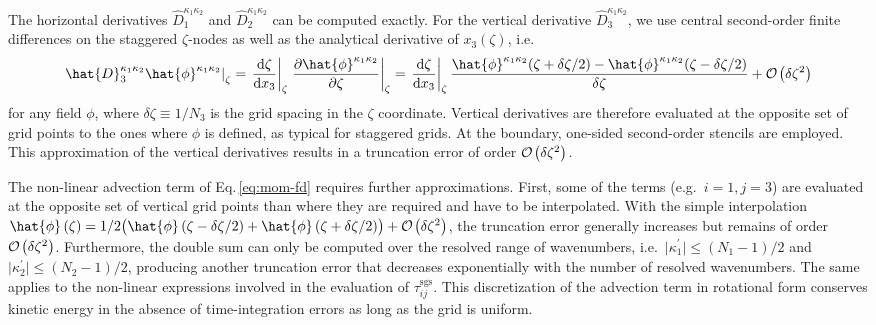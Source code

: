 \documentclass[gmd, manuscript]{copernicus}
\begin{document}
The horizontal derivatives \(\hat{D}_1^{\kappa_1\kappa_2}\) and \(\hat{D}_2^{\kappa_1\kappa_2}\) can be computed exactly.
For the vertical derivative \(\hat{D}_3^{\kappa_1\kappa_2}\), we use central second-order finite differences on the staggered \(\zeta\)-nodes \citep{MoinVerzicco2016} as well as the analytical derivative of \(x_3(\zeta)\), i.e.
\begin{equation}
  \left. \hat{D}_3^{\kappa_1\kappa_2} \hat{\phi}^{\kappa_1\kappa_2} \right|_{\zeta}
  = \left. \frac{\mathrm{d}\zeta}{\mathrm{d}x_3} \right|_\zeta \left. \frac{\partial \hat{\phi}^{\kappa_1\kappa_2}}{\partial \zeta} \right|_\zeta
  = \left. \frac{\mathrm{d}\zeta}{\mathrm{d}x_3} \right|_\zeta \frac{\hat{\phi}^{\kappa_1\kappa_2}(\zeta + \delta \zeta / 2) - \hat{\phi}^{\kappa_1\kappa_2}(\zeta - \delta \zeta / 2)}{\delta \zeta} + \mathcal{O} \mkern -1mu \left( \delta \zeta^2 \right)
\end{equation}
for any field \(\phi\), where \(\delta\zeta \equiv 1/N_3\) is the grid spacing in the \(\zeta\) coordinate.
Vertical derivatives are therefore evaluated at the opposite set of grid points to the ones where \(\phi\) is defined, as typical for staggered grids.
At the boundary, one-sided second-order stencils are employed.
This approximation of the vertical derivatives results in a truncation error of order \(\mathcal{O} \mkern -1mu \left( \delta \zeta^2 \right)\).

The non-linear advection term of Eq.\,\eqref{eq:mom-fd} requires further approximations.
First, some of the terms (e.g.~\(i=1, j=3\)) are evaluated at the opposite set of vertical grid points than where they are required and have to be interpolated.
With the simple interpolation \(\hat{\phi}\left(\zeta\right) = 1/2 \bigl( \hat{\phi}\left(\zeta-\delta\zeta/2\right) + \hat{\phi}\left(\zeta+\delta\zeta/2\right) \bigr) + \mathcal{O} \mkern -1mu \left( \delta \zeta^2 \right)\), the truncation error generally increases but remains of order \(\mathcal{O} \mkern -1mu \left( \delta\zeta^2 \right)\).
Furthermore, the double sum can only be computed over the resolved range of wavenumbers, i.e.~\(\lvert \kappa_1^\prime \rvert \le (N_1-1)/2\) and \(\lvert \kappa_2^\prime \rvert \le (N_2-1)/2\), producing another truncation error that decreases exponentially with the number of resolved wavenumbers.
The same applies to the non-linear expressions involved in the evaluation of \(\tau_{ij}^\mathrm{sgs}\).
This discretization of the advection term in rotational form conserves kinetic energy in the absence of time-integration errors \citep{Mansour+1979} as long as the grid is uniform.
\end{document}
